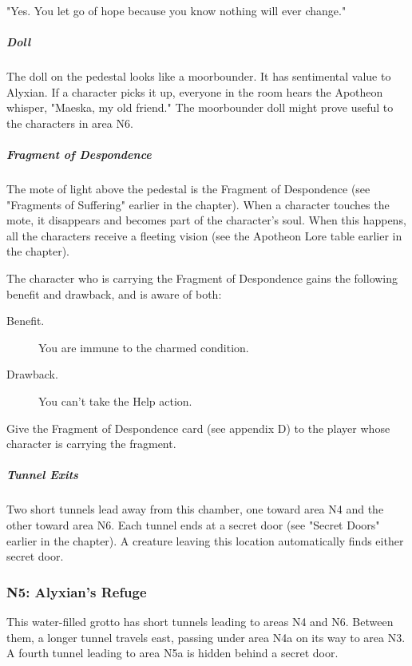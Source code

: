 \documentclass[10pt,a4paper,twoside,fancy,bg=print,twocolumn,openany,nodeprecatedcode]{dndbook}
\begin{document}
\begin{DndReadAloud}{}
"Yes. You let go of hope because you know nothing will ever change."

\end{DndReadAloud}

\subparagraph{Doll}
The doll on the pedestal looks like a moorbounder. It has sentimental value to Alyxian. If a character picks it up, everyone in the room hears the Apotheon whisper, "Maeska, my old friend." The moorbounder doll might prove useful to the characters in area N6.

\subparagraph{Fragment of Despondence}
The mote of light above the pedestal is the Fragment of Despondence (see "Fragments of Suffering" earlier in the chapter). When a character touches the mote, it disappears and becomes part of the character's soul. When this happens, all the characters receive a fleeting vision (see the Apotheon Lore table earlier in the chapter).

The character who is carrying the Fragment of Despondence gains the following benefit and drawback, and is aware of both:

\begin{DndSidebar}[float=!b]{}

\begin{description}
\item[Benefit.]
You are immune to the charmed condition.
\item[Drawback.]
You can't take the Help action.
\end{description}



\end{DndSidebar}

Give the Fragment of Despondence card (see appendix D) to the player whose character is carrying the fragment.

\subparagraph{Tunnel Exits}
Two short tunnels lead away from this chamber, one toward area N4 and the other toward area N6. Each tunnel ends at a secret door (see "Secret Doors" earlier in the chapter). A creature leaving this location automatically finds either secret door.

\subsubsection{N5: Alyxian's Refuge}
This water-filled grotto has short tunnels leading to areas N4 and N6. Between them, a longer tunnel travels east, passing under area N4a on its way to area N3. A fourth tunnel leading to area N5a is hidden behind a secret door.
\end{document}
